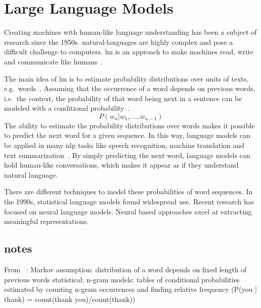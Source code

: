 \chapter{Large Language Models}\label{ch:techOverview}

Creating machines with human-like language understanding has been a subject of research since the 1950s.
\gls{natural-language}s are highly complex and pose a difficult challenge to computers.
\gls{lm} is an approach to make machines read, write and communicate like humans~\autocite{zhao2023survey}.

The main idea of \gls{lm} is to estimate probability distributions over units of texts, e.g.\ words~\autocite{de2015survey}.
Assuming that the occurrence of a word depends on previous words, i.e.\ the context, the probability of that word being next in a sentence can be modeled with a conditional probability~\autocite{jozefowicz2016exploring}.
\[
    P(w_n | w_1, \dots , w_{n-1})
\]
The ability to estimate the probability distributions over words makes it possible to predict the next word for a given sequence.
In this way, language models can be applied in many \gls{nlp} tasks like speech recognition, machine translation and text summarization~\autocite{jozefowicz2016exploring}.
By simply predicting the next word, language models can hold human-like conversations, which makes it appear as if they understand natural language.

There are different techniques to model these probabilities of word sequences.
In the 1990s, statistical language models found widespread use.
Recent research has focused on neural language models.
Neural based approaches excel at extracting meaningful representations.

\section{notes}

From ~\autocite{quadarLM2020}:
Markov assumption: distribution of a word depends on fixed length of previous words
statistical: n-gram models: tables of conditional probabilities estimated by counting n-gram occurrences and finding relative frequency (P(you | thank) = count(thank you)/count(thank))

